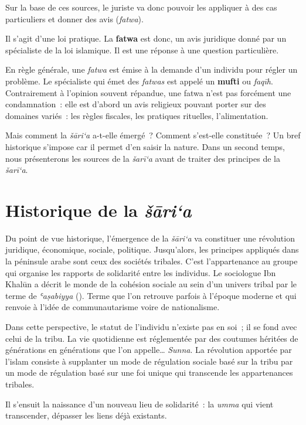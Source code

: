 Sur la base de ces sources, le juriste va donc pouvoir les appliquer à
des cas particuliers et donner des avis (\emph{fatwa}). 

\begin{Def}
Il s'agit d'une
loi pratique. La \textbf{fatwa} est donc, un avis juridique donné par un
spécialiste de la loi islamique. Il est une réponse à une question
particulière. 
\end{Def}
En règle générale, une \emph{fatwa} est émise à la demande
d'un individu pour régler un problème. Le spécialiste qui émet des
\emph{fatwas} est appelé un \textbf{mufti} ou \emph{faqīh}.
Contrairement à l'opinion souvent répandue, une fatwa n'est pas
forcément une condamnation~: elle est d'abord un avis religieux pouvant
porter sur des domaines variés~: les règles fiscales, les pratiques
rituelles, l'alimentation.

Mais comment la \emph{šāri`a} a-t-elle émergé~? Comment s'est-elle
constituée~? Un bref historique s'impose car il permet d'en saisir la
nature. Dans un second temps, nous présenterons les sources de la
\emph{šarī`a} avant de traiter des principes de la \emph{šarī`a}.

 
\section{Historique de la
\emph{šāri`a}}

Du point de vue historique, l'émergence de la \emph{šāri`a} va
constituer une révolution juridique, économique, sociale, politique.
Jusqu'alors, les principes appliqués dans la péninsule arabe sont ceux
des sociétés tribales. C'est l'appartenance au groupe qui organise les
rapports de solidarité entre les individus. Le sociologue Ibn Khalūn a
décrit le monde de la cohésion sociale au sein d'un univers tribal par
le terme de \emph{ʿaṣabiyya} (). Terme que l'on retrouve
parfois à l'époque moderne et qui renvoie à l'idée de communautarisme
voire de nationalisme.

Dans cette perspective, le statut de l'individu n'existe pas en soi~; il
se fond avec celui de la tribu. La vie quotidienne est réglementée par
des coutumes héritées de générations en générations que l'on
appelle\ldots{} \emph{Sunna}. La révolution apportée par l'islam
consiste à supplanter un mode de régulation sociale basé sur la tribu
par un mode de régulation basé sur une foi unique qui transcende les
appartenances tribales.

Il s'ensuit la naissance d'un nouveau lieu de solidarité~: la
\emph{umma} qui vient transcender, dépasser les liens déjà existants.

